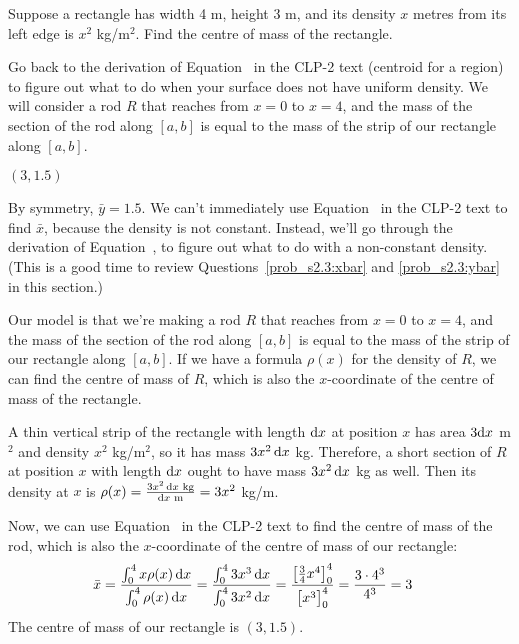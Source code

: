 \begin{Mquestion}
Suppose a rectangle has width 4 m, height 3 m, and its density $x$ metres from its left edge is $x^2$ kg/m$^2$. Find the centre of mass of the rectangle.

\begin{center}
\end{center}

\end{Mquestion}
\begin{hint}
Go back to the derivation of Equation~ in the CLP-2 text (centroid for a region) to figure out what to do when your surface does not have uniform density. We will consider a rod $R$ that reaches from $x=0$ to $x=4$, and the mass of the section of the rod along $[a,b]$ is equal to the mass of the strip of our rectangle along $[a,b]$.
\end{hint}
\begin{answer}
$(3,1.5)$
\end{answer}
\begin{solution}
By symmetry, $\bar y = 1.5$. We can't immediately use Equation~  in the CLP-2 text to find $\bar x$, because the density is not constant. Instead, we'll go through the derivation of Equation~, to figure out what to do with a non-constant density. (This is a good time to review Questions~\ref{prob_s2.3:xbar} and \ref{prob_s2.3:ybar} in this section.)

Our model is that we're making a rod $R$ that reaches from $x=0$ to $x=4$, and the mass of the section of the rod along $[a,b]$ is equal to the mass of the strip of our rectangle along $[a,b]$. If we have a formula $\rho(x)$ for the density of $R$, we can find the centre of mass of $R$, which is also the $x$-coordinate of the centre of mass of the rectangle.

A thin vertical strip of the rectangle with length $\mathrm{d}x$ at position $x$ has area $3\mathrm{d}x$ m$^2$ and density $x^2$ kg/m$^2$, so it has mass $3x^2\,\mathrm{d}x$ kg. Therefore, a short section of $R$ at position $x$ with length $\mathrm{d}x$ ought to have mass $3x^2\,\mathrm{d}x$ kg as well. Then its density at $x$ is $\rho(x) = \frac{3x^2\,\mathrm{d}x\text{ kg}}{\mathrm{d}x \text{ m}} = 3x^2$ kg/m.

Now, we can use Equation~ in the CLP-2 text to find the centre of mass of the rod, which is also the $x$-coordinate of the centre of mass of our rectangle:
\begin{align*}
\bar x &= \frac{\int_0^4 x\rho(x)\,\mathrm{d}x}{\int_0^4 \rho(x)\,\mathrm{d}x}
= \frac{\int_0^4 3x^3\,\mathrm{d}x}{\int_0^4 3x^2\,\mathrm{d}x} =
\frac{\left[\frac{3}{4}x^4\right]_0^4}{\left[\vphantom{\frac34}x^3\right]_0^4}=\frac{3\cdot 4^3}{4^3}=3
\end{align*}
The centre of mass of our rectangle is $(3,1.5)$.
\end{solution}

